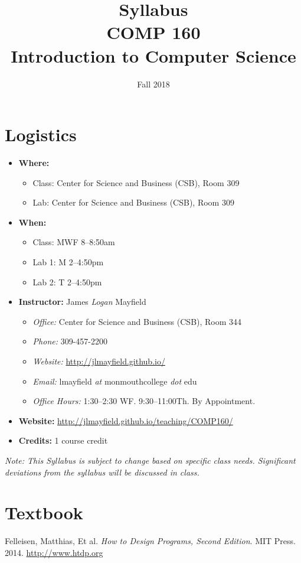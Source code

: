 \documentclass[10pt]{article}
\title{Syllabus \\ COMP 160 \\ Introduction to Computer Science}
\author{  }
\date{Fall 2018}
\begin{document}
\maketitle

\section{Logistics}
\begin{itemize}
\item \textbf{Where: }
\begin{itemize}
\item Class: Center for Science and Business (CSB), Room 309
\item Lab: Center for Science and Business (CSB), Room 309
\end{itemize}
\item \textbf{When: }
\begin{itemize}
  \item Class: MWF 8--8:50am
  \item Lab 1: M 2--4:50pm
  \item Lab 2: T 2--4:50pm
\end{itemize}
\item \textbf{Instructor: } James \textit{Logan} Mayfield
\begin{itemize}
\item \textit{Office: } Center for Science and Business (CSB), Room 344
\item \textit{Phone: } 309-457-2200 %
\item \textit{Website: } \url{http://jlmayfield.github.io/}
\item \textit{Email: } lmayfield \textit{at} monmouthcollege \textit{dot} edu
\item \textit{Office Hours: }  1:30--2:30 WF. 9:30--11:00Th. By Appointment.
\end{itemize}
\item \textbf{Website: } \url{http://jlmayfield.github.io/teaching/COMP160/}
\item \textbf{Credits: } 1 course credit
\end{itemize}
\emph{Note: This Syllabus is subject to change based on specific class needs. Significant deviations from the syllabus will be discussed in class.}

\section{Textbook}

\noindent
Felleisen, Matthias, Et al\@. \textit{How to Design Programs, Second Edition}. MIT Press. 2014. \url{http://www.htdp.org} %
\end{document}

